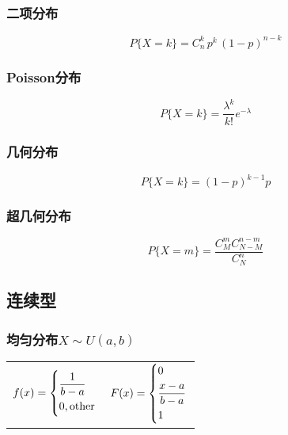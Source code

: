 \subsubsection{二项分布}
\label{ssub:二项分布}

\begin{definition}[$X \sim B(n,p)$]
    \[
        P\{ X=k \} = C_n^k \,p^k\, (1-p)^{n-k}
    \]
\end{definition}

\subsubsection{Poisson分布}
\label{ssub:poisson分布}

\begin{definition}[$X \sim \pi(k)$]
    \[
        P\{X = k\} = \frac{\lambda^k}{k!} e^{-\lambda}
    \]
\end{definition}

\subsubsection{几何分布}
\label{ssub:几何分布}

\begin{definition}[$X \sim G(p)$]
    \[
        P\{X = k\} = (1-p)^{k-1} p
    \]
\end{definition}

\subsubsection{超几何分布}
\label{ssub:超几何分布}

\begin{definition}[$X \sim H(N, M, n$]
    \[
        P\{X = m\} = \frac{C_M^m C_{N-M}^{n-m}}{C_N^n}
    \]
\end{definition}

\subsection{连续型}
\label{sub:连续型}

\subsubsection{均匀分布$X \sim U(a,b)$}
\label{ssub:均匀分布}

\begin{tabular}{r|l}
    $ f(x) =
    \begin{dcases}
        \frac{1}{b-a} \\
        0, \text{other}
    \end{dcases} $ & $ F(x) =
    \begin{dcases}
        0 \\
        \frac{x-a}{b-a} \\
        1
    \end{dcases} $
\end{tabular}

